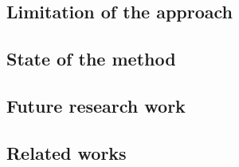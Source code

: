 \documentclass[a4paper]{article}
\begin{document}
\subsection{Limitation of the approach}

\subsection{State of the method}

\subsection{Future research work}

\subsection{Related works}

\appendix
\setlength{\parskip}{0pt}
\printbibliography
\end{document}
